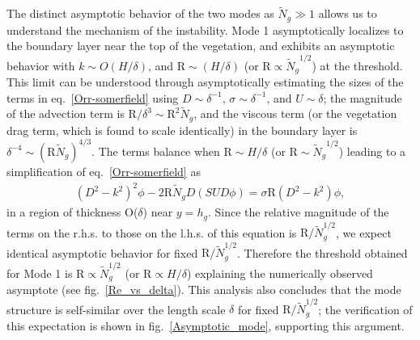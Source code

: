 \documentclass[aps,prl,twocolumn,superscriptaddress,10pt]{revtex4-1}  %
\newcommand{\hg}{h_g}
\newcommand{\Rey}{\text{R}}
\newcommand{\Ndg}{\tilde{N}_g}
\begin{document}
The distinct asymptotic behavior of the two modes as $\Ndg \gg 1$ allows us to understand the mechanism of the instability. 
Mode 1 asymptotically localizes to the boundary layer near the top of the vegetation, and exhibits an asymptotic behavior with $k \sim O(H/\delta)$, and $\Rey \sim (H/\delta)$ (or $\Rey \propto {\Ndg}^{1/2}$) at the threshold. 
This limit can be understood through asymptotically estimating the sizes of the terms in eq.~\eqref{Orr-somerfield} using $D\sim \delta^{-1}$, $\sigma \sim \delta^{-1}$, and $U\sim \delta$; the magnitude of the advection term is $\Rey/\delta^3 \sim \Rey^2 \Ndg $, and the viscous term (or the vegetation drag term, which is found to scale identically) in the boundary layer is $\delta^{-4} \sim (\Rey \Ndg)^{4/3}$. 
The terms balance when $\Rey \sim H/\delta$ (or $\Rey \sim {\Ndg}^{1/2}$) leading to a simplification of eq.~\eqref{Orr-somerfield} as
\begin{align}
(D^2-k^2)^2 \phi- 2 \Rey \Ndg D( SUD\phi) = \sigma \Rey (D^2-k^2)\phi,
\label{eqn:mode1asymp}
\end{align} 
in a region of thickness O($\delta$) near $y=\hg$.
Since the relative magnitude of the terms on the r.h.s. to those on the l.h.s. of this equation is $\Rey/\Ndg^{1/2}$, we expect identical asymptotic behavior for fixed $\Rey/\Ndg^{1/2}$. Therefore the threshold obtained for Mode 1 is $\Rey \propto \Ndg^{1/2}$ (or $\Rey \propto H/\delta$) explaining the numerically observed asymptote (see fig.~\ref{Re_vs_delta}). 
This analysis also concludes that the mode structure is self-similar over the length scale $\delta$ for fixed $\Rey/\Ndg^{1/2}$; the verification of this expectation is shown in fig.~\ref{Asymptotic_mode}, supporting this argument.
\end{document}
